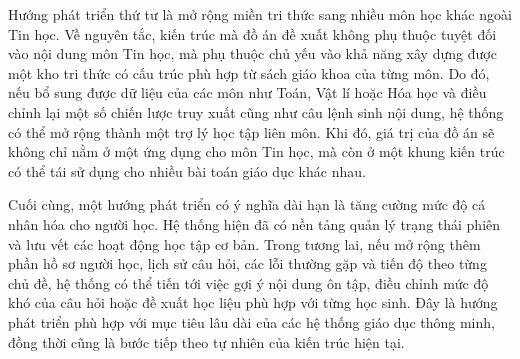 \documentclass[../DoAn.tex]{subfiles}
\begin{document}
Hướng phát triển thứ tư là mở rộng miền tri thức sang nhiều môn học khác ngoài Tin học. Về nguyên tắc, kiến trúc mà đồ án đề xuất không phụ thuộc tuyệt đối vào nội dung môn Tin học, mà phụ thuộc chủ yếu vào khả năng xây dựng được một kho tri thức có cấu trúc phù hợp từ sách giáo khoa của từng môn. Do đó, nếu bổ sung được dữ liệu của các môn như Toán, Vật lí hoặc Hóa học và điều chỉnh lại một số chiến lược truy xuất cũng như câu lệnh sinh nội dung, hệ thống có thể mở rộng thành một trợ lý học tập liên môn. Khi đó, giá trị của đồ án sẽ không chỉ nằm ở một ứng dụng cho môn Tin học, mà còn ở một khung kiến trúc có thể tái sử dụng cho nhiều bài toán giáo dục khác nhau.

Cuối cùng, một hướng phát triển có ý nghĩa dài hạn là tăng cường mức độ cá nhân hóa cho người học. Hệ thống hiện đã có nền tảng quản lý trạng thái phiên và lưu vết các hoạt động học tập cơ bản. Trong tương lai, nếu mở rộng thêm phần hồ sơ người học, lịch sử câu hỏi, các lỗi thường gặp và tiến độ theo từng chủ đề, hệ thống có thể tiến tới việc gợi ý nội dung ôn tập, điều chỉnh mức độ khó của câu hỏi hoặc đề xuất học liệu phù hợp với từng học sinh. Đây là hướng phát triển phù hợp với mục tiêu lâu dài của các hệ thống giáo dục thông minh, đồng thời cũng là bước tiếp theo tự nhiên của kiến trúc hiện tại.
\end{document}
